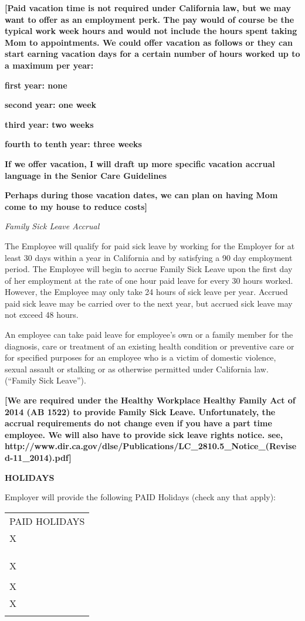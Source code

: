 \documentclass[]{article}
\newcommand{\toprule}{\hrulefill}
\newcommand{\bottomrule}{\hrulefill}
\begin{document}
\textbf{{[}Paid vacation time is not required under California law, but
we may want to offer as an employment perk. The pay would of course be
the typical work week hours and would not include the hours spent taking
Mom to appointments. We could offer vacation as follows or they can
start earning vacation days for a certain number of hours worked up to a
maximum per year: }

\textbf{first year: none}

\textbf{second year: one week}

\textbf{third year: two weeks}

\textbf{fourth to tenth year: three weeks }

\textbf{If we offer vacation, I will draft up more specific vacation
accrual language in the Senior Care Guidelines}

\textbf{Perhaps during those vacation dates, we can plan on having Mom
come to my house to reduce costs{]}}

\emph{Family Sick Leave Accrual}

The Employee will qualify for paid sick leave by working for the
Employer for at least 30 days within a year in California and by
satisfying a 90 day employment period. The Employee will begin to accrue
Family Sick Leave upon the first day of her employment at the rate of
one hour paid leave for every 30 hours worked. However, the Employee may
only take 24 hours of sick leave per year. Accrued paid sick leave may
be carried over to the next year, but accrued sick leave may not exceed
48 hours.

An employee can take paid leave for employee's own or a family member
for the diagnosis, care or treatment of an existing health condition or
preventive care or for specified purposes for an employee who is a
victim of domestic violence, sexual assault or stalking or as otherwise
permitted under California law. (``Family Sick Leave'').

\textbf{{[}We are required under the Healthy Workplace Healthy Family
Act of 2014 (AB 1522) to provide Family Sick Leave. Unfortunately, the
accrual requirements do not change even if you have a part time
employee. We will also have to provide sick leave rights notice. see,
http://www.dir.ca.gov/dlse/Publications/LC\_2810.5\_Notice\_(Revised-11\_2014).pdf{]}}

\textbf{HOLIDAYS}

Employer will provide the following PAID Holidays (check any that
apply):

\begin{tabular}[c]{@{}l@{}}
\toprule
PAID HOLIDAYS\tabularnewline
X\tabularnewline
\tabularnewline
\tabularnewline
\tabularnewline
X\tabularnewline
\tabularnewline
X\tabularnewline
X\tabularnewline
\bottomrule
\end{tabular}
\end{document}
